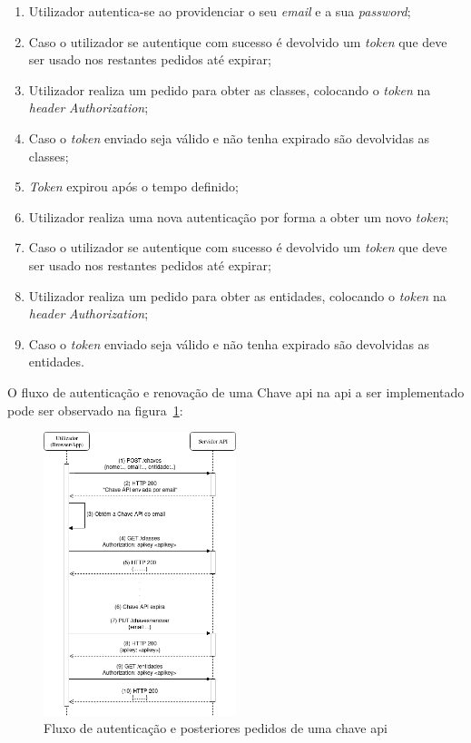 \begin{enumerate}
    \item Utilizador autentica-se ao providenciar o seu \textit{email} e a sua \textit{password};
    \item Caso o utilizador se autentique com sucesso é devolvido um \textit{token} que deve ser usado nos 
    restantes pedidos até expirar;
    \item Utilizador realiza um pedido para obter as classes, colocando o \textit{token} na \textit{header} 
    \textit{Authorization};
    \item Caso o \textit{token} enviado seja válido e não tenha expirado são devolvidas as classes;
    \item \textit{Token} expirou após o tempo definido;
    \item Utilizador realiza uma nova autenticação por forma a obter um novo \textit{token};
    \item Caso o utilizador se autentique com sucesso é devolvido um \textit{token} que deve ser usado nos 
    restantes pedidos até expirar;
    \item Utilizador realiza um pedido para obter as entidades, colocando o \textit{token} na 
    \textit{header} \textit{Authorization};
    \item Caso o \textit{token} enviado seja válido e não tenha expirado são devolvidas as entidades.
\end{enumerate}

O fluxo de autenticação e renovação de uma Chave \acrshort{api} na \acrshort{api} a ser implementado pode ser 
observado na figura~\ref{fig:chaveAuth}:
\begin{figure}[H]
    \centering
    \includegraphics[width=0.5\textwidth]{img/chaveAuth.png}
    \caption{Fluxo de autenticação e posteriores pedidos de uma chave \acrshort{api}}\label{fig:chaveAuth}
\end{figure}

